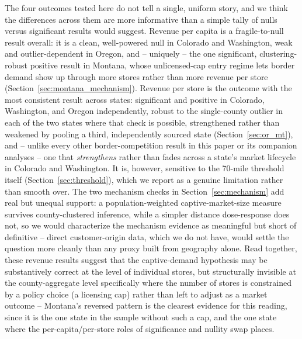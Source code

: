 ﻿\documentclass{article}
\begin{document}
The four outcomes tested here do not tell a single, uniform story, and we think the differences across
them are more informative than a simple tally of nulls versus significant results would suggest. Revenue
per capita is a fragile-to-null result overall: it is a clean, well-powered null in Colorado and
Washington, weak and outlier-dependent in Oregon, and -- uniquely -- the one significant, clustering-robust
positive result in Montana, whose unlicensed-cap entry regime lets border demand show up through more
stores rather than more revenue per store (Section~\ref{sec:montana_mechanism}). Revenue per store is the
outcome with the most consistent result across states: significant and positive in Colorado, Washington,
and Oregon independently, robust to the single-county outlier in each of the two states where that check
is possible, strengthened rather than weakened by pooling a third, independently sourced state
(Section~\ref{sec:or_mt}), and -- unlike every other border-competition result in this paper or its
companion analyses -- one that \emph{strengthens} rather than fades across a state's market lifecycle in
Colorado and Washington. It is, however, sensitive to the 70-mile threshold itself
(Section~\ref{sec:threshold}), which we report as a genuine limitation rather than smooth over. The two
mechanism checks in Section~\ref{sec:mechanism} add real but unequal support: a population-weighted
captive-market-size measure survives county-clustered inference, while a simpler distance dose-response
does not, so we would characterize the mechanism evidence as meaningful but short of definitive -- direct
customer-origin data, which we do not have, would settle the question more cleanly than any proxy built
from geography alone. Read together, these revenue results suggest that the captive-demand hypothesis may
be substantively correct at the level of individual stores, but structurally invisible at the
county-aggregate level specifically where the number of stores is constrained by a policy choice (a
licensing cap) rather than left to adjust as a market outcome -- Montana's reversed pattern is the clearest
evidence for this reading, since it is the one state in the sample without such a cap, and the one state
where the per-capita/per-store roles of significance and nullity swap places.
\end{document}
